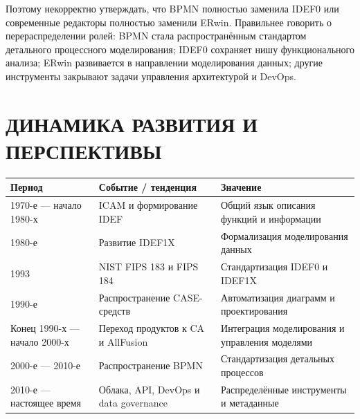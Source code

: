 \documentclass[essaypaper,paper]{pmk-graduate}
\begin{document}
\par

Поэтому некорректно утверждать, что BPMN полностью заменила IDEF0 или современные редакторы полностью заменили ERwin. Правильнее говорить о перераспределении ролей: BPMN стала распространённым стандартом детального процессного моделирования; IDEF0 сохраняет нишу функционального анализа; ERwin развивается в направлении моделирования данных; другие инструменты закрывают задачи управления архитектурой и DevOps.

\par

\chapter{ДИНАМИКА РАЗВИТИЯ И ПЕРСПЕКТИВЫ}

\small

\setlength{\tabcolsep}{4pt}

\renewcommand{\arraystretch}{1.15}

\begin{longtable}{|p{}|p{}|p{}|}

\hline

\textbf{Период} & \textbf{Событие / тенденция} & \textbf{Значение} \\ \hline

1970-е — начало 1980-х & ICAM и формирование IDEF & Общий язык описания функций и информации \\ \hline

1980-е & Развитие IDEF1X & Формализация моделирования данных \\ \hline

1993 & NIST FIPS 183 и FIPS 184 & Стандартизация IDEF0 и IDEF1X \\ \hline

1990-е & Распространение CASE-средств & Автоматизация диаграмм и проектирования \\ \hline

Конец 1990-х — начало 2000-х & Переход продуктов к CA и AllFusion & Интеграция моделирования и управления моделями \\ \hline

2000-е — 2010-е & Распространение BPMN & Стандартизация детальных процессов \\ \hline

2010-е — настоящее время & Облака, API, DevOps и data governance & Распределённые инструменты и метаданные \\ \hline

\end{longtable}
\end{document}

